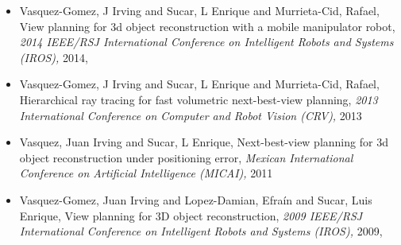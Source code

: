 \begin{itemize}
\item Vasquez-Gomez, J Irving and Sucar, L Enrique and Murrieta-Cid, Rafael, View planning for 3d object reconstruction with a mobile manipulator robot, \textit{ 2014 IEEE/RSJ International Conference on Intelligent Robots and Systems (IROS),} 2014, \href{https://doi.org/10.1109/IROS.2014.6943158} {\faFilePdfO} 
\item Vasquez-Gomez, J Irving and Sucar, L Enrique and Murrieta-Cid, Rafael, Hierarchical ray tracing for fast volumetric next-best-view planning, \textit{ 2013 International Conference on Computer and Robot Vision (CRV),} 2013 
\item Vasquez, Juan Irving and Sucar, L Enrique, Next-best-view planning for 3d object reconstruction under positioning error, \textit{ Mexican International Conference on Artificial Intelligence (MICAI),} 2011 
\item Vasquez-Gomez, Juan Irving and Lopez-Damian, Efraín and Sucar, Luis Enrique, View planning for 3D object reconstruction, \textit{ 2009 IEEE/RSJ International Conference on Intelligent Robots and Systems (IROS),} 2009, \href{https://doi.org/10.1109/IROS.2009.5354383} {\faFilePdfO} 
\end{itemize} 
